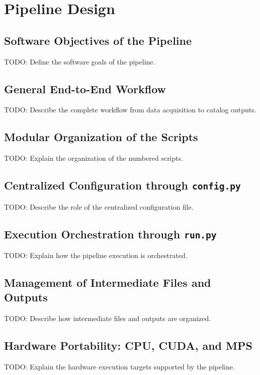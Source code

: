 \chapter{Pipeline Design}

\section{Software Objectives of the Pipeline}
TODO: Define the software goals of the pipeline.

\section{General End-to-End Workflow}
TODO: Describe the complete workflow from data acquisition to catalog outputs.

\section{Modular Organization of the Scripts}
TODO: Explain the organization of the numbered scripts.

\section{Centralized Configuration through \texttt{config.py}}
TODO: Describe the role of the centralized configuration file.

\section{Execution Orchestration through \texttt{run.py}}
TODO: Explain how the pipeline execution is orchestrated.

\section{Management of Intermediate Files and Outputs}
TODO: Describe how intermediate files and outputs are organized.

\section{Hardware Portability: CPU, CUDA, and MPS}
TODO: Explain the hardware execution targets supported by the pipeline.
